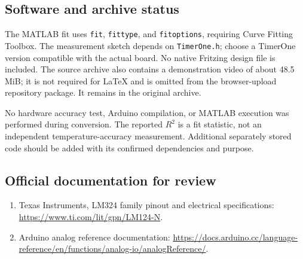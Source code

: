 \documentclass[11pt,a4paper]{article}
\begin{document}
\subsection{Software and archive status}
The MATLAB fit uses \texttt{fit}, \texttt{fittype}, and \texttt{fitoptions}, requiring Curve Fitting Toolbox. The measurement sketch depends on \texttt{TimerOne.h}; choose a TimerOne version compatible with the actual board. No native Fritzing design file is included. The source archive also contains a demonstration video of about 48.5 MiB; it is not required for LaTeX and is omitted from the browser-upload repository package. It remains in the original archive.

No hardware accuracy test, Arduino compilation, or MATLAB execution was performed during conversion. The reported $R^2$ is a fit statistic, not an independent temperature-accuracy measurement. Additional separately stored code should be added with its confirmed dependencies and purpose.
\subsection{Official documentation for review}
\begin{enumerate}
\item Texas Instruments, LM324 family pinout and electrical specifications: \url{https://www.ti.com/lit/gpn/LM124-N}.
\item Arduino analog reference documentation: \url{https://docs.arduino.cc/language-reference/en/functions/analog-io/analogReference/}.
\end{enumerate}
\end{document}
